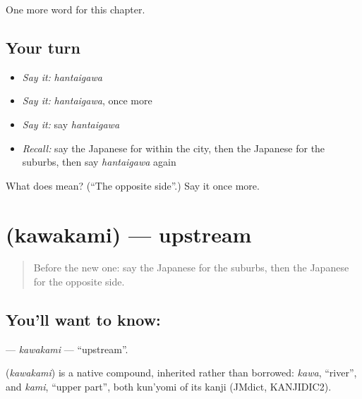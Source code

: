 \begin{grammarlens}[title={What you've built}]
One more word for this chapter.
\end{grammarlens}

\subsection*{Your turn}
\begin{itemize}
\raggedright
  \item \emph{Say it:} \emph{hantaigawa}
  \item \emph{Say it:} \emph{hantaigawa}, once more
  \item \emph{Say it:} say \emph{hantaigawa}
  \item \emph{Recall:} say the Japanese for within the city, then the Japanese for the suburbs, then say \emph{hantaigawa} again
\end{itemize}

\begin{tcolorbox}[breakable,colback=teal!4,colframe=teal!35!black,title={Before you move on}]
What does  mean? (\textquotedblleft{}The opposite side\textquotedblright{}.) Say it once more.
\end{tcolorbox}
\section[\texorpdfstring{\ja{かわかみ} (kawakami)}{かわかみ (kawakami)}]{ (kawakami) — upstream}

\label{lesson:JA-C82-kawakami}



\begin{quote}
Before the new one: say the Japanese for the suburbs, then the Japanese for the opposite side.
\end{quote}

\subsection*{You'll want to know: }
\textbf{} — \emph{kawakami} — \textquotedblleft{}upstream\textquotedblright{}.

\begin{cousinweb}
\textbf{} (\emph{kawakami}) is a native compound, inherited rather than borrowed: \emph{kawa}, \textquotedblleft{}river\textquotedblright{}, and \emph{kami}, \textquotedblleft{}upper part\textquotedblright{}, both kun'yomi of its kanji (JMdict, KANJIDIC2).
\end{cousinweb}

